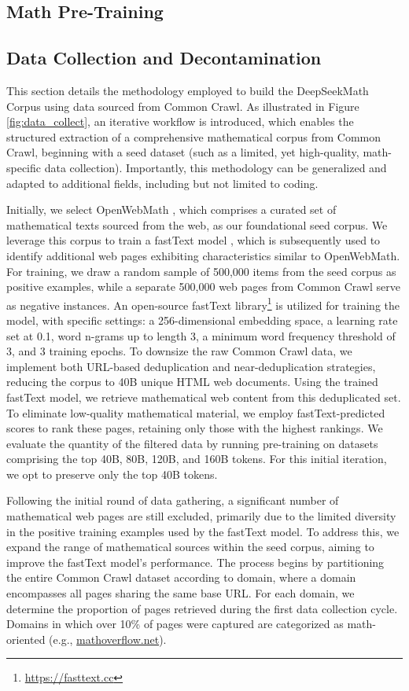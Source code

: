 \begin{itemize}[topsep=0pt]
\section{Math Pre-Training}

\subsection{Data Collection and Decontamination} This section details the methodology employed to build the DeepSeekMath Corpus using data sourced from Common Crawl. As illustrated in Figure \ref{fig:data_collect}, an iterative workflow is introduced, which enables the structured extraction of a comprehensive mathematical corpus from Common Crawl, beginning with a seed dataset (such as a limited, yet high-quality, math-specific data collection). Importantly, this methodology can be generalized and adapted to additional fields, including but not limited to coding.

Initially, we select OpenWebMath \citep{openwebmath}, which comprises a curated set of mathematical texts sourced from the web, as our foundational seed corpus. We leverage this corpus to train a fastText model \citep{joulin2016fasttext}, which is subsequently used to identify additional web pages exhibiting characteristics similar to OpenWebMath. For training, we draw a random sample of 500,000 items from the seed corpus as positive examples, while a separate 500,000 web pages from Common Crawl serve as negative instances. An open-source fastText library\footnote{\url{https://fasttext.cc}} is utilized for training the model, with specific settings: a 256-dimensional embedding space, a learning rate set at 0.1, word n-grams up to length 3, a minimum word frequency threshold of 3, and 3 training epochs. To downsize the raw Common Crawl data, we implement both URL-based deduplication and near-deduplication strategies, reducing the corpus to 40B unique HTML web documents. Using the trained fastText model, we retrieve mathematical web content from this deduplicated set. To eliminate low-quality mathematical material, we employ fastText-predicted scores to rank these pages, retaining only those with the highest rankings. We evaluate the quantity of the filtered data by running pre-training on datasets comprising the top 40B, 80B, 120B, and 160B tokens. For this initial iteration, we opt to preserve only the top 40B tokens.

Following the initial round of data gathering, a significant number of mathematical web pages are still excluded, primarily due to the limited diversity in the positive training examples used by the fastText model. To address this, we expand the range of mathematical sources within the seed corpus, aiming to improve the fastText model’s performance. The process begins by partitioning the entire Common Crawl dataset according to domain, where a domain encompasses all pages sharing the same base URL. For each domain, we determine the proportion of pages retrieved during the first data collection cycle. Domains in which over 10\% of pages were captured are categorized as math-oriented (e.g., \url{mathoverflow.net}).


\end{itemize}
